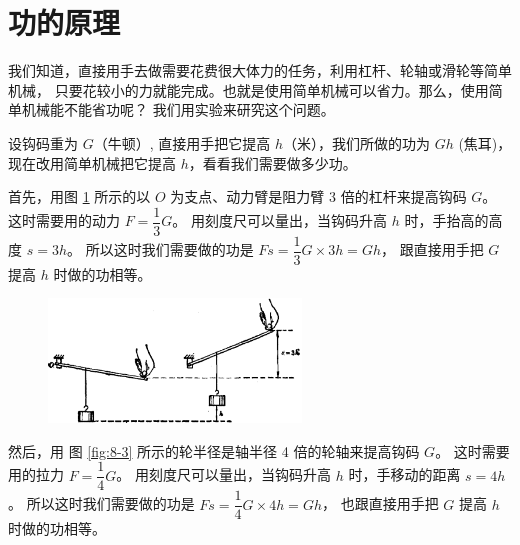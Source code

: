 \section{功的原理}\label{sec:8-3}

我们知道，直接用手去做需要花费很大体力的任务，利用杠杆、轮轴或滑轮等简单机械，
只要花较小的力就能完成。也就是使用简单机械可以省力。那么，使用简单机械能不能省功呢？
我们用实验来研究这个问题。

设钩码重为 $G$（牛顿）, 直接用手把它提高 $h$（米），我们所做的功为 $Gh$ (焦耳)，
现在改用简单机械把它提高 $h$，看看我们需要做多少功。

首先，用图 \ref{fig:8-2} 所示的以 $O$ 为支点、动力臂是阻力臂 3 倍的杠杆来提高钩码 $G$。
这时需要用的动力 $F = \dfrac{1}{3} G$。
用刻度尺可以量出，当钩码升高 $h$ 时，手抬高的高度 $s = 3h$。
所以这时我们需要做的功是 $Fs = \dfrac{1}{3} G \times 3h = Gh$，
跟直接用手把 $G$ 提高 $h$ 时做的功相等。

\begin{figure}[htbp]
    \centering
    \includegraphics[width=0.6\textwidth]{../pic/czwl1-ch8-2}
    \caption{}\label{fig:8-2}
\end{figure}

然后，用 图 \ref{fig:8-3} 所示的轮半径是轴半径 4 倍的轮轴来提高钩码 $G$。
这时需要用的拉力 $F = \dfrac{1}{4} G$。
用刻度尺可以量出，当钩码升高 $h$ 时，手移动的距离 $s = 4h$。
所以这时我们需要做的功是 $Fs = \dfrac{1}{4} G \times 4h = Gh$，
也跟直接用手把 $G$ 提高 $h$ 时做的功相等。

